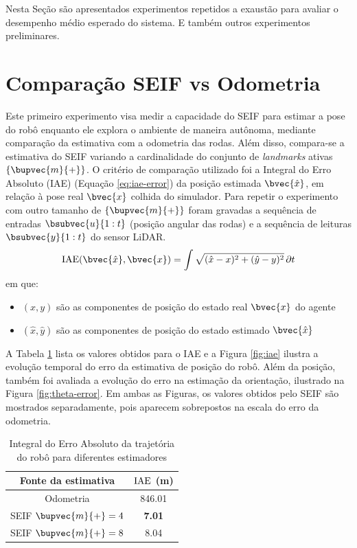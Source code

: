 Nesta Seção são apresentados experimentos repetidos a exaustão para avaliar o desempenho médio esperado do sistema. E também outros experimentos preliminares.

\section{Comparação SEIF vs Odometria}
\label{sec:exp-estimate-comparison}
Este primeiro experimento visa medir a capacidade do SEIF para estimar a 
pose do robô enquanto ele explora o ambiente de maneira autônoma, 
mediante comparação da estimativa 
com a odometria das rodas. Além disso, compara-se a estimativa do SEIF 
variando a cardinalidade do conjunto de \textit{landmarks} 
ativas $\{\bupvec{m}{+}\}$. O critério de comparação utilizado foi a 
Integral do Erro Absoluto (IAE) (Equação \ref{eq:iae-error}) da posição estimada $\bvec{\hat{x}}$, em 
relação à pose real $\bvec{x}$ colhida do simulador. Para repetir o experimento com outro tamanho de $\{\bupvec{m}{+}\}$ foram gravadas a sequência de entradas $\bsubvec{u}{1:t}$ 
(posição angular das rodas) e a sequência de leituras $\bsubvec{y}{1:t}$ 
do sensor LiDAR.
\begin{equation}
  \IAE(\bvec{\hat{x}}, \bvec{x}) = \int{
    \sqrt{(\hat{x} - x)^2 + (\hat{y} - y)^2} \, \partial t
  }
  \label{eq:iae-error}
\end{equation}
em que: \begin{itemize}
  \item $(x, y)$ são as componentes de posição do estado real $\bvec{x}$ do agente
  \item $(\hat{x}, \hat{y})$ são as componentes de posição do estado estimado $\bvec{\hat{x}}$
\end{itemize}

A Tabela \ref{table:iae} lista os valores obtidos para o IAE e a Figura \ref{fig:iae} ilustra a evolução 
temporal do erro da estimativa de posição do robô. Além 
da posição, também foi avaliada a evolução do erro na estimação da 
orientação, ilustrado na Figura \ref{fig:theta-error}. Em ambas as 
Figuras, os valores obtidos pelo SEIF são mostrados separadamente, pois aparecem sobrepostos na escala do erro da odometria.

\begin{table}[]
\caption{Integral do Erro Absoluto da trajetória do robô para diferentes estimadores}
\label{table:iae}
\center
\begin{tabular}{cc}
\hline
Fonte da estimativa & $\operatorname{IAE}$ (m) \\ \hline
Odometria & 846.01 \\
SEIF $\bupvec{m}{+} = 4$ & \textbf{7.01 }\\
SEIF $\bupvec{m}{+} = 8$ & 8.04 \\ \hline
\end{tabular}
\end{table}

